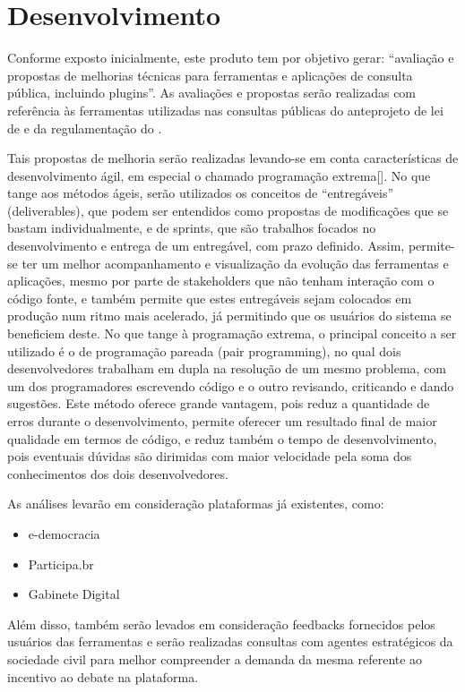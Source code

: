 \chapter{Desenvolvimento}
Conforme exposto inicialmente, este produto tem por objetivo gerar:
``avaliação e propostas de melhorias técnicas para ferramentas e aplicações de consulta pública, incluindo plugins''. 
As avaliações e propostas serão realizadas com referência às ferramentas utilizadas nas consultas públicas do anteprojeto de lei de \pdp e da regulamentação do \mc.
	
	Tais propostas de melhoria serão realizadas levando-se em conta características de desenvolvimento ágil, em especial o chamado programação extrema[]. No que tange aos métodos ágeis, serão utilizados os conceitos de “entregáveis” (deliverables), que podem ser entendidos como propostas de modificações que se bastam individualmente, e de sprints, que são trabalhos focados no desenvolvimento e entrega de um entregável, com prazo definido. Assim, permite-se ter um melhor acompanhamento e visualização da evolução das ferramentas e aplicações, mesmo por parte de stakeholders que não tenham interação com o código fonte, e também permite que estes entregáveis sejam colocados em produção num ritmo mais acelerado, já permitindo que os usuários do sistema se beneficiem deste. No que tange à programação extrema, o principal conceito a ser utilizado é o de programação pareada (pair programming), no qual dois desenvolvedores trabalham em dupla na resolução de um mesmo problema, com um dos programadores escrevendo código e o outro revisando, criticando e dando sugestões. Este método oferece grande vantagem, pois reduz a quantidade de erros durante o desenvolvimento, permite oferecer um resultado final de maior qualidade em termos de código, e reduz também o tempo de desenvolvimento, pois eventuais dúvidas são dirimidas com maior velocidade pela soma dos conhecimentos dos dois desenvolvedores.
	
	As análises levarão em consideração plataformas já existentes, como:
\begin{itemize}
\item{e-democracia}
\item{Participa.br}
\item{Gabinete Digital}
\end{itemize}
Além disso, também serão levados em consideração feedbacks fornecidos pelos usuários das ferramentas e serão realizadas consultas com agentes estratégicos da sociedade civil para melhor compreender a demanda da mesma referente ao incentivo ao debate na plataforma.
